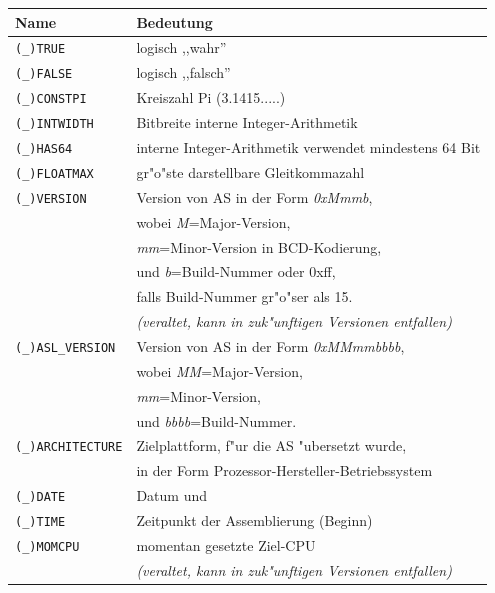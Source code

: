 \documentclass[12pt,a4paper,twoside]{report}
\newcommand{\asname}{AS}
\newcommand{\predefsym}[1]{{\tt (\_)#1}}
\begin{document}
\begin{table}[p]
\begin{center}\begin{tabular}{|l|l|}
\hline
Name             & Bedeutung \\
\hline
\hline
\predefsym{TRUE}         & logisch ,,wahr'' \\
\predefsym{FALSE}        & logisch ,,falsch'' \\
\predefsym{CONSTPI}      & Kreiszahl Pi (3.1415.....) \\
\predefsym{INTWIDTH}     & Bitbreite interne Integer-Arithmetik \\
\predefsym{HAS64}        & interne Integer-Arithmetik verwendet mindestens 64 Bit \\
\predefsym{FLOATMAX}     & gr"o"ste darstellbare Gleitkommazahl \\
\predefsym{VERSION}      & Version von \asname{} in der Form {\em 0xMmmb}, \\
                         & wobei {\em M}=Major-Version, \\
                         & {\em mm}=Minor-Version in BCD-Kodierung, \\
                         & und {\em b}=Build-Nummer oder 0xff, \\
                         & falls Build-Nummer gr"o"ser als 15. \\
                         & {\em (veraltet, kann in zuk"unftigen Versionen entfallen) } \\
\predefsym{ASL\_VERSION} & Version von \asname{} in der Form {\em 0xMMmmbbbb}, \\
                         & wobei {\em MM}=Major-Version, \\
                         & {\em mm}=Minor-Version, \\
                         & und {\em bbbb}=Build-Nummer. \\
\predefsym{ARCHITECTURE} & Zielplattform, f"ur die \asname{} "ubersetzt wurde, \\
                         & in der Form Prozessor-Hersteller-Betriebssystem \\
\predefsym{DATE}         & Datum und \\
\predefsym{TIME}         & Zeitpunkt der Assemblierung (Beginn) \\
\predefsym{MOMCPU}       & momentan gesetzte Ziel-CPU \\
                         & {\em (veraltet, kann in zuk"unftigen Versionen entfallen) } \\

\end{tabular}
\end{center}
\end{table}
\end{document}
